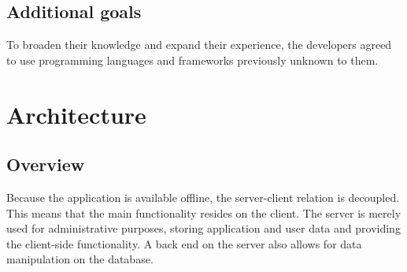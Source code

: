 \documentclass{report}
\begin{document}
		\subsection{Additional goals}
			To broaden their knowledge and expand their experience, the developers agreed to use programming languages and frameworks previously unknown to them.
	\clearpage
	
	\section{Architecture}
	
			\subsection{Overview}
				Because the application is available offline, the server-client relation is decoupled. This means that the main functionality resides on the client. The server is merely used for administrative purposes, storing application and user data and providing the client-side functionality. A back end on the server also allows for data manipulation on the database.
				
\end{document}
